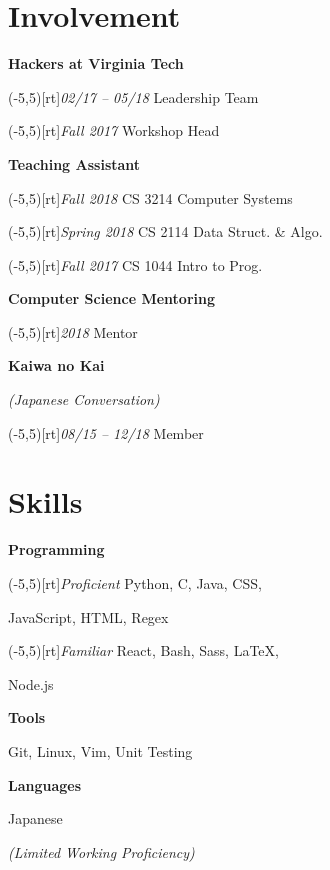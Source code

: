 \documentclass[9pt]{extarticle}
\newcommand{\info}[1]{\color{info}\textit{#1}}
\newcommand{\sidebox}[1]{\makebox(-5,5)[rt]{#1}}
\newcommand{\sidenote}[1]{\scriptsize\info{#1}}
\newcommand{\Subsection}[2]{
    {\normalsize\color{subsection}\textbf{#1}}
    \begin{trivlist}
        \color{bullet}
        #2
    \end{trivlist}
}
\newcommand{\ChronoItem}[2]{
    \item
    \sidebox{\sidenote{#2}}%
    \color{bullet}#1
}
\newcommand{\InfoItem}[1]{
    \item
    \info{(#1)}
}
\newcommand{\vsubspace}{\vspace{1.5em}}
\newcommand{\vsmallspace}{\vspace{1em}}
\newcommand{\vrightspace}{\vfill}
\begin{document}
\begin{paracol}{2}
\begin{rightcolumn}
        \section{Involvement}
            \Subsection{Hackers at Virginia Tech}{
                \ChronoItem{Leadership Team}{02/17 – 05/18}
                \ChronoItem{Workshop Head}{Fall 2017}
            }
            \vsmallspace
            \Subsection{Teaching Assistant}{
                \ChronoItem{CS 3214 Computer Systems}{Fall 2018}
                \ChronoItem{CS 2114 Data Struct. \& Algo.}{Spring 2018}
                \ChronoItem{CS 1044 Intro to Prog.}{Fall 2017}
            }
            \vsmallspace
            \Subsection{Computer Science Mentoring}{
                \ChronoItem{Mentor}{2018}
            }
            \vsmallspace
            \Subsection{Kaiwa no Kai}{
                \InfoItem{Japanese Conversation}
                \ChronoItem{Member}{08/15 – 12/18}
            }
        \vrightspace
        \section{Skills}
            \Subsection{Programming}{
                \ChronoItem{Python, C, Java, CSS,}{Proficient}
                \item JavaScript, HTML, Regex
                \ChronoItem{React, Bash, Sass, LaTeX,}{Familiar}
                \item Node.js
            }
            \vsubspace
            \Subsection{Tools}{
                \item Git, Linux, Vim, Unit Testing
            }
            \vsubspace
            \Subsection{Languages}{
                \item Japanese
                \InfoItem{Limited Working Proficiency}
            }
    \end{rightcolumn}
\end{paracol}
\end{document}
